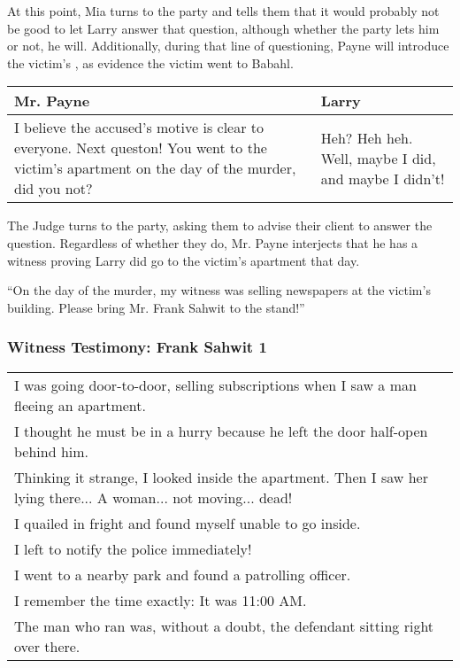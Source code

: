 At this point, Mia turns to the party and tells them that it would probably not be good to let Larry answer that question, although whether the party lets him or not, he will. Additionally, during that line of questioning, Payne will introduce the victim's , as evidence the victim went to Babahl.


\begin{center}
\begin{tabular}{p{2.5in} p{2.5in}}
Mr. Payne & Larry \\\hline
I believe the accused's motive is clear to everyone. Next queston! You went to the victim's apartment on the day of the murder, did you not? & Heh? Heh heh. Well, maybe I did, and maybe I didn't!
\end{tabular}
\end{center}

The Judge turns to the party, asking them to advise their client to answer the question. Regardless of whether they do, Mr. Payne interjects that he has a witness proving Larry did go to the victim's apartment that day. 

\begin{center}
``On the day of the murder, my witness was selling newspapers at the victim's building. Please bring Mr. Frank Sahwit to the stand!''
\end{center}

\subsubsection{Witness Testimony: Frank Sahwit 1}
\begin{center}
\begin{tabular}{p{4in}}
I was going door-to-door, selling subscriptions when I saw a man fleeing an apartment.\\
I thought he must be in a hurry because he left the door half-open behind him. \\
Thinking it strange, I looked inside the apartment. Then I saw her lying there... A woman... not moving... dead! \\
I quailed in fright and found myself unable to go inside. \\
I left to notify the police immediately! \\
I went to a nearby park and found a patrolling officer. \\
I remember the time exactly: It was 11:00 AM. \\
The man who ran was, without a doubt, the defendant sitting right over there. \\
\end{tabular}
\end{center}


